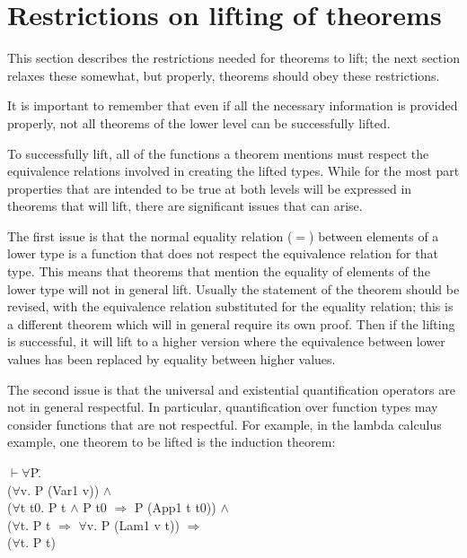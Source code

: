 \documentclass[envcountsame,runningheads]{llncs}
\begin{document}
%
\section{Restrictions on lifting of theorems}
%
\label{restrictions}

This section describes the restrictions needed for theorems to lift;
the next section relaxes these somewhat, but
properly, theorems should obey these restrictions.

It is important to remember that even if all the necessary information
is provided properly, not all theorems of the lower level 
can be successfully lifted.

To successfully lift, all of the functions a theorem mentions must
respect the equivalence relations involved in creating the lifted types.
While for the most part properties that are intended to be true at
both levels will be expressed in theorems that will lift, there are
significant issues that can arise.

The first issue is that the normal equality relation ($=$) between elements
of a lower type is a function that does not respect the equivalence
relation for that type.  This means that theorems that mention the 
equality of elements of the lower type will not in general lift. 
Usually the statement of the theorem should be revised,
with the equivalence relation substituted for the equality relation;
this is a different theorem which will in general require its own proof.
Then if the lifting is successful, it will lift to
a higher version where the equivalence between lower values has been
replaced by equality between higher values.

The second issue is that the universal and existential quantification
operators
are not in general respectful.
In particular, quantification over function types
may consider functions that are not respectful.
For example, in the lambda calculus example, one theorem to be
lifted is the induction theorem:
{\tt \begin{tabbing}
\hspace{5.5mm}
    $\vdash \forall$P\=. \\
\>       ($\forall$v. P (Var1 v)) $\wedge$ \\
\>       ($\forall$t t0. P t $\wedge$ P t0 $\Rightarrow$ P (App1 t t0)) $\wedge$ \\
\>       ($\forall$t. P t $\Rightarrow$ $\forall$v. P (Lam1 v t)) $\Rightarrow$ \\
\>       ($\forall$t. P t)
\end{tabbing}}
\end{document}
